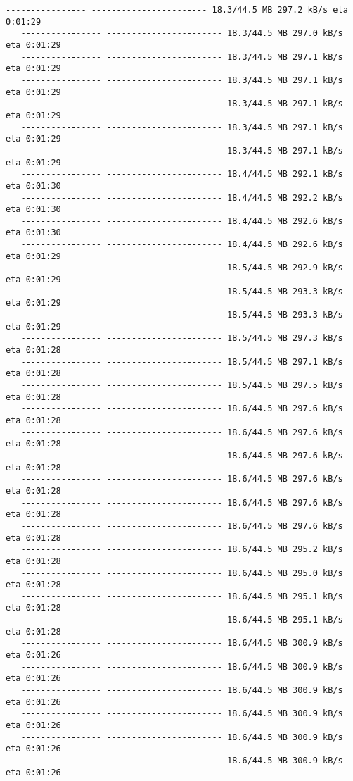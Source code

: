 \documentclass[11pt]{article}
\begin{document}
\begin{Verbatim}[commandchars=\\\{\}]
   ---------------- ----------------------- 18.3/44.5 MB 297.2 kB/s eta 0:01:29
   ---------------- ----------------------- 18.3/44.5 MB 297.0 kB/s eta 0:01:29
   ---------------- ----------------------- 18.3/44.5 MB 297.1 kB/s eta 0:01:29
   ---------------- ----------------------- 18.3/44.5 MB 297.1 kB/s eta 0:01:29
   ---------------- ----------------------- 18.3/44.5 MB 297.1 kB/s eta 0:01:29
   ---------------- ----------------------- 18.3/44.5 MB 297.1 kB/s eta 0:01:29
   ---------------- ----------------------- 18.3/44.5 MB 297.1 kB/s eta 0:01:29
   ---------------- ----------------------- 18.4/44.5 MB 292.1 kB/s eta 0:01:30
   ---------------- ----------------------- 18.4/44.5 MB 292.2 kB/s eta 0:01:30
   ---------------- ----------------------- 18.4/44.5 MB 292.6 kB/s eta 0:01:30
   ---------------- ----------------------- 18.4/44.5 MB 292.6 kB/s eta 0:01:29
   ---------------- ----------------------- 18.5/44.5 MB 292.9 kB/s eta 0:01:29
   ---------------- ----------------------- 18.5/44.5 MB 293.3 kB/s eta 0:01:29
   ---------------- ----------------------- 18.5/44.5 MB 293.3 kB/s eta 0:01:29
   ---------------- ----------------------- 18.5/44.5 MB 297.3 kB/s eta 0:01:28
   ---------------- ----------------------- 18.5/44.5 MB 297.1 kB/s eta 0:01:28
   ---------------- ----------------------- 18.5/44.5 MB 297.5 kB/s eta 0:01:28
   ---------------- ----------------------- 18.6/44.5 MB 297.6 kB/s eta 0:01:28
   ---------------- ----------------------- 18.6/44.5 MB 297.6 kB/s eta 0:01:28
   ---------------- ----------------------- 18.6/44.5 MB 297.6 kB/s eta 0:01:28
   ---------------- ----------------------- 18.6/44.5 MB 297.6 kB/s eta 0:01:28
   ---------------- ----------------------- 18.6/44.5 MB 297.6 kB/s eta 0:01:28
   ---------------- ----------------------- 18.6/44.5 MB 297.6 kB/s eta 0:01:28
   ---------------- ----------------------- 18.6/44.5 MB 295.2 kB/s eta 0:01:28
   ---------------- ----------------------- 18.6/44.5 MB 295.0 kB/s eta 0:01:28
   ---------------- ----------------------- 18.6/44.5 MB 295.1 kB/s eta 0:01:28
   ---------------- ----------------------- 18.6/44.5 MB 295.1 kB/s eta 0:01:28
   ---------------- ----------------------- 18.6/44.5 MB 300.9 kB/s eta 0:01:26
   ---------------- ----------------------- 18.6/44.5 MB 300.9 kB/s eta 0:01:26
   ---------------- ----------------------- 18.6/44.5 MB 300.9 kB/s eta 0:01:26
   ---------------- ----------------------- 18.6/44.5 MB 300.9 kB/s eta 0:01:26
   ---------------- ----------------------- 18.6/44.5 MB 300.9 kB/s eta 0:01:26
   ---------------- ----------------------- 18.6/44.5 MB 300.9 kB/s eta 0:01:26

\end{Verbatim}
\end{document}
